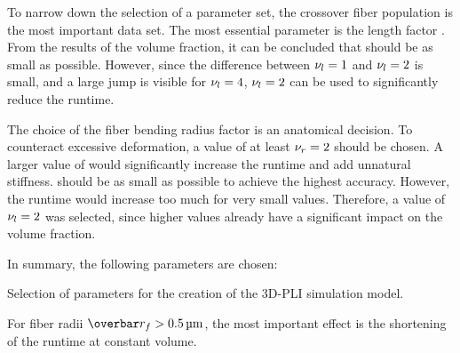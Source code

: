 \par
%
To narrow down the selection of a parameter set, the crossover fiber population \cfbs{} is the most important data set.
The most essential parameter is the length factor \segLengthFactor{}.
From the results of the volume fraction, it can be concluded that \segLengthFactor{} should be as small as possible.
However, since the difference between $\textnormal{$\nu_{l}$}=\SI{1}{}$ and $\textnormal{$\nu_{l}$}=\SI{2}{}$ is small, and a large jump is visible for $\textnormal{$\nu_{l}$}=\SI{4}{}$, $\textnormal{$\nu_{l}$}=\SI{2}{}$ can be used to significantly reduce the runtime.
\par
%
The choice of the fiber bending radius factor \segRadiusFactor{} is an anatomical decision.
To counteract excessive deformation, a value of at least $\textnormal{$\nu_{r}$} = \SI{2}{}$ should be chosen.
A larger value of \segRadiusFactor{} would significantly increase the runtime and add unnatural stiffness.
\segLengthFactor{} should be as small as possible to achieve the highest accuracy.
However, the runtime would increase too much for very small values.
Therefore, a value of $\textnormal{$\nu_{l}$} = \SI{2}{}$ was selected, since higher values already have a significant impact on the volume fraction.
\par
%
In summary, the following parameters are chosen:
%
\begin{table}[H]
%
\centering
\caption{Selection of parameters for the creation of the \ac{3D-PLI} simulation model.}
\label{tab:parameterSetup}
\end{table}
%
For fiber radii $\fiberRadiusMean > \SI{0.5}{\micro\meter}$, the most important effect is the shortening of the runtime at constant volume.
